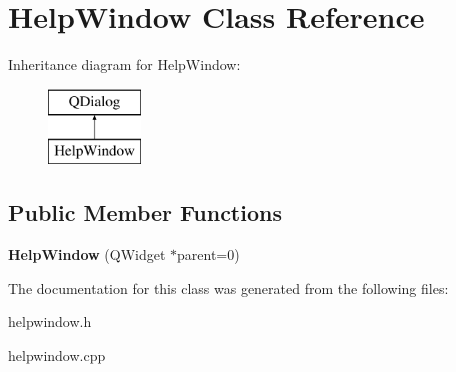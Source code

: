 \hypertarget{class_help_window}{}\section{Help\+Window Class Reference}
\label{class_help_window}
Inheritance diagram for Help\+Window\+:\begin{figure}[H]
\begin{center}
\leavevmode
\includegraphics[height=2.000000cm]{class_help_window}
\end{center}
\end{figure}
\subsection*{Public Member Functions}
\begin{DoxyCompactItemize}
\item 
\hypertarget{class_help_window_a9015baabf277f3973dc6028031d57467}{}{\bfseries Help\+Window} (Q\+Widget $\ast$parent=0)\label{class_help_window_a9015baabf277f3973dc6028031d57467}

\end{DoxyCompactItemize}


The documentation for this class was generated from the following files\+:\begin{DoxyCompactItemize}
\item 
helpwindow.\+h\item 
helpwindow.\+cpp\end{DoxyCompactItemize}

